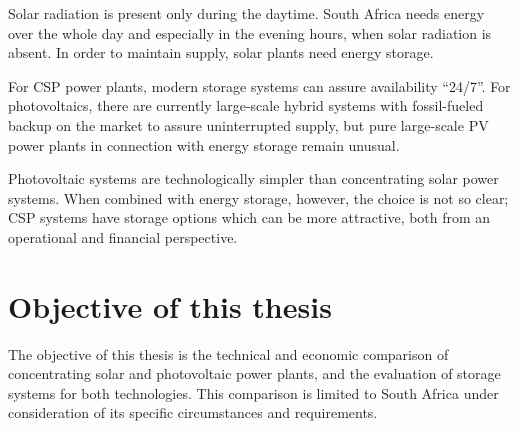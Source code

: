 Solar radiation is present only during the daytime. South Africa needs energy over the whole day and especially in the evening hours, when solar radiation is absent. In order to maintain supply, solar plants need energy storage. 


For CSP power plants, modern storage systems can assure availability \enquote{24/7}. For photovoltaics, there are currently large-scale hybrid systems with fossil-fueled backup on the market \cite{BELECTRIC2015} to assure uninterrupted supply, but pure large-scale PV power plants in connection with energy storage remain unusual. 


Photovoltaic systems are technologically simpler than concentrating solar power systems. When combined with energy storage, however, the choice is not so clear; CSP systems have storage options which can be more attractive, both from an operational and financial perspective.


\section{Objective of this thesis}

The objective of this thesis is the technical and economic comparison of concentrating solar and photovoltaic power plants, and the evaluation of storage systems for both technologies. This comparison is limited to South Africa under consideration of its specific circumstances and requirements.

